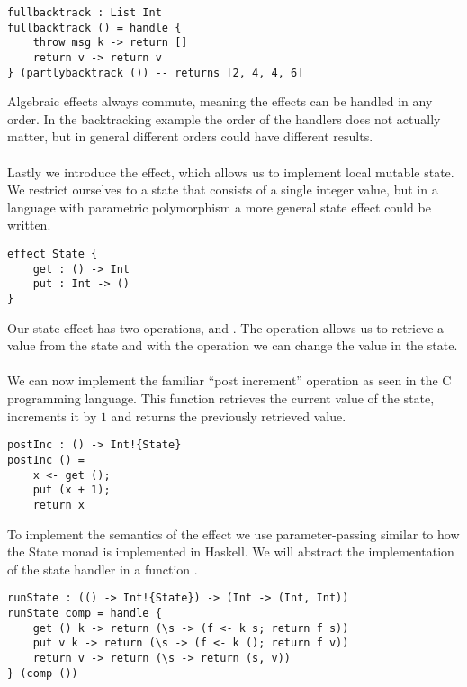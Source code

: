 {\begin{verbatim}
fullbacktrack : List Int
fullbacktrack () = handle {
	throw msg k -> return []
	return v -> return v
} (partlybacktrack ()) -- returns [2, 4, 4, 6]
\end{verbatim}

Algebraic effects always commute, meaning the effects can be handled in any order.
In the backtracking example the order of the handlers does not actually matter, but in general different orders could have different results.
\\\\
Lastly we introduce the  effect, which allows us to implement local mutable state.
We restrict ourselves to a state that consists of a single integer value, but in a language with parametric polymorphism a more general state effect could be written.

\begin{verbatim}
effect State {
	get : () -> Int
	put : Int -> ()
}
\end{verbatim}

Our state effect has two operations,  and .
The  operation allows us to retrieve a value from the state and with the  operation we can change the value in the state.
\\\\
We can now implement the familiar ``post increment'' operation as seen in the C programming language.
This function retrieves the current value of the state, increments it by $1$ and returns the previously retrieved value.

\begin{verbatim}
postInc : () -> Int!{State}
postInc () =
	x <- get ();
	put (x + 1);
	return x
\end{verbatim}

To implement the semantics of the  effect we use parameter-passing similar to how the State monad is implemented in Haskell. We will abstract the implementation of the state handler in a function .

\begin{verbatim}
runState : (() -> Int!{State}) -> (Int -> (Int, Int))
runState comp = handle {
	get () k -> return (\s -> (f <- k s; return f s))
	put v k -> return (\s -> (f <- k (); return f v))
	return v -> return (\s -> return (s, v))
} (comp ())
\end{verbatim}

}
